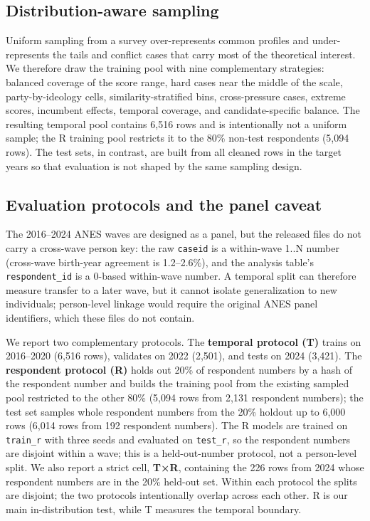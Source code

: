 \subsection{Distribution-aware
sampling}\label{distribution-aware-sampling}

Uniform sampling from a survey over-represents common profiles and
under-represents the tails and conflict cases that carry most of the
theoretical interest. We therefore draw the training pool with nine
complementary strategies: balanced coverage of the score range, hard
cases near the middle of the scale, party-by-ideology cells,
similarity-stratified bins, cross-pressure cases, extreme scores,
incumbent effects, temporal coverage, and candidate-specific balance.
The resulting temporal pool contains 6,516 rows and is intentionally not
a uniform sample; the R training pool restricts it to the 80\% non-test
respondents (5,094 rows). The test sets, in contrast, are built from all
cleaned rows in the target years so that evaluation is not shaped by the
same sampling design.

\subsection{Evaluation protocols and the panel
caveat}\label{evaluation-protocols-and-the-panel-caveat}

The 2016--2024 ANES waves are designed as a panel, but the released
files do not carry a cross-wave person key: the raw \texttt{caseid} is a
within-wave 1..N number (cross-wave birth-year agreement is 1.2--2.6\%),
and the analysis table's \texttt{respondent\_id} is a 0-based
within-wave number. A temporal split can therefore measure transfer to a
later wave, but it cannot isolate generalization to new individuals;
person-level linkage would require the original ANES panel identifiers,
which these files do not contain.

We report two complementary protocols. The \textbf{temporal protocol
(T)} trains on 2016--2020 (6,516 rows), validates on 2022 (2,501), and
tests on 2024 (3,421). The \textbf{respondent protocol (R)} holds out
20\% of respondent numbers by a hash of the respondent number and builds
the training pool from the existing sampled pool restricted to the other
80\% (5,094 rows from 2,131 respondent numbers); the test set samples
whole respondent numbers from the 20\% holdout up to 6,000 rows (6,014
rows from 192 respondent numbers). The R models are trained on
\texttt{train\_r} with three seeds and evaluated on \texttt{test\_r}, so
the respondent numbers are disjoint within a wave; this is a
held-out-number protocol, not a person-level split. We also report a
strict cell, \textbf{T×R}, containing the 226 rows from 2024 whose
respondent numbers are in the 20\% held-out set. Within each protocol
the splits are disjoint; the two protocols intentionally overlap across
each other. R is our main in-distribution test, while T measures the
temporal boundary.

